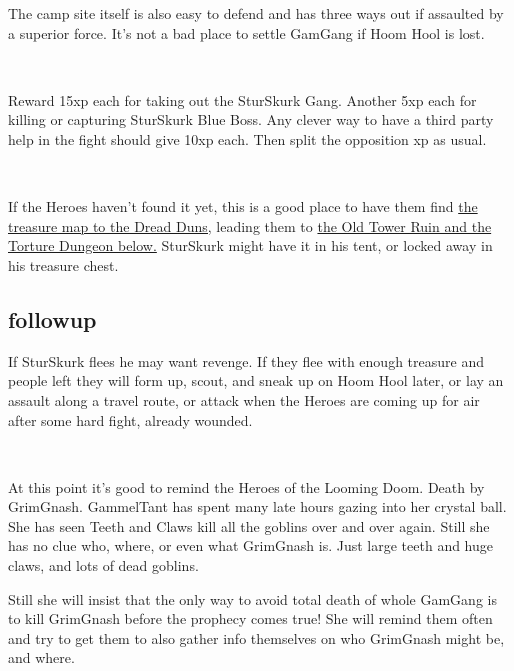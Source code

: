 The camp site itself is also easy to defend and has three ways out if assaulted by a superior force. It's not a bad place to settle GamGang if Hoom Hool is lost.

\

Reward 15xp each for taking out the SturSkurk Gang. Another 5xp each for killing or capturing SturSkurk Blue Boss. Any clever way to have a third party help in the fight should give 10xp each. Then split the opposition xp as usual.

\

If the Heroes haven't found it yet, this is a good place to have them find 
\hyperref[appendixtreasuremap]{the treasure map to the Dread Duns,} 
leading them to 
\hyperref[xxtorturedungeon]{the Old Tower Ruin and the Torture Dungeon below.} 
SturSkurk might have it in his tent, or locked away in his treasure chest.


\subsection*{followup}

If SturSkurk flees he may want revenge. If they flee with enough treasure and people left they will form up, scout, and sneak up on Hoom Hool later, or lay an assault along a travel route, or attack when the Heroes are coming up for air after some hard fight, already wounded.

\

At this point it's good to remind the Heroes of the Looming Doom. Death by GrimGnash. GammelTant has spent many late hours gazing into her crystal ball. She has seen Teeth and Claws kill all the goblins over and over again. Still she has no clue who, where, or even what GrimGnash is. Just large teeth and huge claws, and lots of dead goblins. 

Still she will insist that the only way to avoid total death of whole GamGang is to kill GrimGnash before the prophecy comes true! She will remind them often and try to get them to also gather info themselves on who GrimGnash might be, and where.














\clearpage
